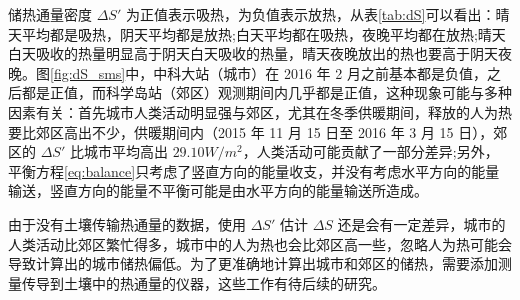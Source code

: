 储热通量密度 \(\Delta S'\) 为正值表示吸热，为负值表示放热，从表\ref{tab:dS}可以看出：晴天平均都是吸热，阴天平均都是放热;白天平均都在吸热，夜晚平均都在放热;晴天白天吸收的热量明显高于阴天白天吸收的热量，晴天夜晚放出的热也要高于阴天夜晚。图\ref{fig:dS_sms}中，中科大站（城市）在 2016 年 2 月之前基本都是负值，之后都是正值，而科学岛站（郊区）观测期间内几乎都是正值，这种现象可能与多种因素有关：首先城市人类活动明显强与郊区，尤其在冬季供暖期间，释放的人为热要比郊区高出不少，供暖期间内（2015 年 11 月 15 日至 2016 年 3 月 15 日），郊区的 \(\Delta S'\) 比城市平均高出 \(29.10W/m^2\)，人类活动可能贡献了一部分差异;另外，平衡方程\ref{eq:balance}只考虑了竖直方向的能量收支，并没有考虑水平方向的能量输送，竖直方向的能量不平衡可能是由水平方向的能量输送所造成。

由于没有土壤传输热通量的数据，使用 \(\Delta S'\) 估计 \(\Delta S\) 还是会有一定差异，城市的人类活动比郊区繁忙得多，城市中的人为热也会比郊区高一些，忽略人为热可能会导致计算出的城市储热偏低。为了更准确地计算出城市和郊区的储热，需要添加测量传导到土壤中的热通量的仪器，这些工作有待后续的研究。
